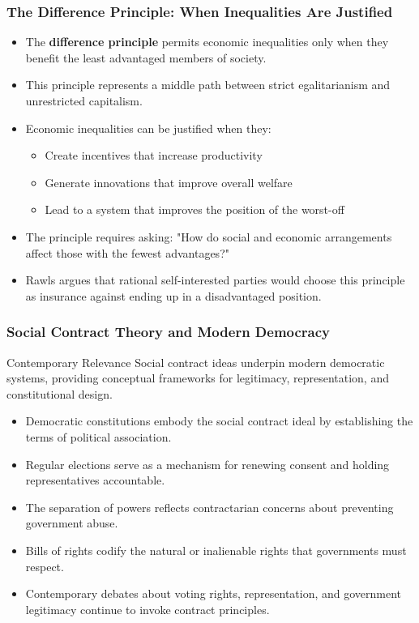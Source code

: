 \documentclass[aspectratio=169]{beamer}
\begin{document}
\begin{frame}
  \frametitle{The Difference Principle: When Inequalities Are Justified}
  
  \begin{itemize}
    \item The \textbf{difference principle} permits economic inequalities only when they benefit the least advantaged members of society.
    \item This principle represents a middle path between strict egalitarianism and unrestricted capitalism.
    \item Economic inequalities can be justified when they:
      \begin{itemize}
        \item Create incentives that increase productivity
        \item Generate innovations that improve overall welfare
        \item Lead to a system that improves the position of the worst-off
      \end{itemize}
    \item The principle requires asking: "How do social and economic arrangements affect those with the fewest advantages?"
    \item Rawls argues that rational self-interested parties would choose this principle as insurance against ending up in a disadvantaged position.
  \end{itemize}
\end{frame}

\begin{frame}
  \frametitle{Social Contract Theory and Modern Democracy}
  
  \begin{alertblock}{Contemporary Relevance}
    Social contract ideas underpin modern democratic systems, providing conceptual frameworks for legitimacy, representation, and constitutional design.
  \end{alertblock}
  
  \begin{itemize}
    \item Democratic constitutions embody the social contract ideal by establishing the terms of political association.
    \item Regular elections serve as a mechanism for renewing consent and holding representatives accountable.
    \item The separation of powers reflects contractarian concerns about preventing government abuse.
    \item Bills of rights codify the natural or inalienable rights that governments must respect.
    \item Contemporary debates about voting rights, representation, and government legitimacy continue to invoke contract principles.
  \end{itemize}
\end{frame}
\end{document}
